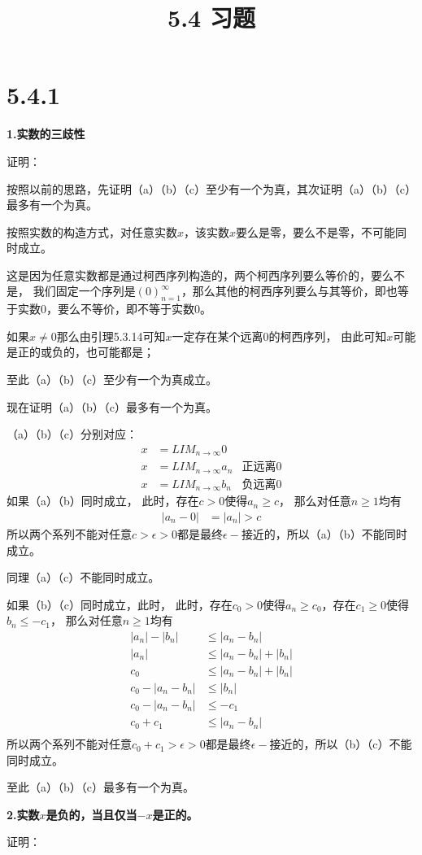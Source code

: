 \documentclass{article}
\theoremstyle{mystyle}
\begin{document}
\title{5.4 习题}
\maketitle

\section*{5.4.1}

\textbf{1.实数的三歧性}

证明：

按照以前的思路，先证明（a）（b）（c）至少有一个为真，其次证明（a）（b）（c）最多有一个为真。

按照实数的构造方式，对任意实数$x$，该实数$x$要么是零，要么不是零，不可能同时成立。

这是因为任意实数都是通过柯西序列构造的，两个柯西序列要么等价的，要么不是，
我们固定一个序列是$(0)_{n=1}^\infty$，那么其他的柯西序列要么与其等价，即也等于实数0，要么不等价，即不等于实数0。

如果$x \neq 0$那么由引理5.3.14可知$x$一定存在某个远离0的柯西序列，
由此可知$x$可能是正的或负的，也可能都是；

至此（a）（b）（c）至少有一个为真成立。

现在证明（a）（b）（c）最多有一个为真。

（a）（b）（c）分别对应：
\begin{align}
  x & = LIM_{n \rightarrow \infty}0                 \\
  x & = LIM_{n \rightarrow \infty}a_n & \text{正远离0} \\
  x & = LIM_{n \rightarrow \infty}b_n & \text{负远离0}
\end{align}
如果（a）（b）同时成立，
此时，存在$c>0$使得$a_n \geq c$，
那么对任意$n \geq 1$均有
\begin{align*}
  |a_n - 0| & = |a_n| > c
\end{align*}
所以两个系列不能对任意$c > \epsilon > 0$都是最终$\epsilon -$接近的，所以（a）（b）不能同时成立。

同理（a）（c）不能同时成立。

如果（b）（c）同时成立，此时，
此时，存在$c_0>0$使得$a_n \geq c_0$，存在$c_1 \geq 0$使得$b_n \leq -c_1$，
那么对任意$n \geq 1$均有
\begin{align*}
  |a_n| - |b_n|     & \leq |a_n - b_n|          \\
  |a_n|             & \leq |a_n - b_n|  + |b_n| \\
  c_0               & \leq |a_n - b_n| + |b_n|  \\
  c_0 - |a_n - b_n| & \leq |b_n|                \\
  c_0 - |a_n - b_n| & \leq -c_1                 \\
  c_0 + c_1         & \leq |a_n - b_n|          \\
\end{align*}
所以两个系列不能对任意$c_0 + c_1 > \epsilon > 0$都是最终$\epsilon -$接近的，所以（b）（c）不能同时成立。

至此（a）（b）（c）最多有一个为真。

\textbf{2.实数$x$是负的，当且仅当$-x$是正的。}

证明：
\end{document}
